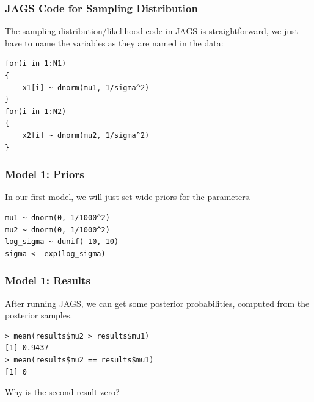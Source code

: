 \documentclass{beamer}
\begin{document}
\begin{frame}[fragile]
\frametitle{JAGS Code for Sampling Distribution}
The sampling distribution/likelihood code in JAGS is straightforward,
we just have to name the variables as they are named in the data:
\begin{verbatim}
for(i in 1:N1)
{
    x1[i] ~ dnorm(mu1, 1/sigma^2)
}
for(i in 1:N2)
{
    x2[i] ~ dnorm(mu2, 1/sigma^2)
}
\end{verbatim}

\end{frame}


\begin{frame}[fragile]
\frametitle{Model 1: Priors}
In our first model, we will just set wide priors for the parameters.

\begin{verbatim}
mu1 ~ dnorm(0, 1/1000^2)
mu2 ~ dnorm(0, 1/1000^2)
log_sigma ~ dunif(-10, 10)
sigma <- exp(log_sigma)
\end{verbatim}

\end{frame}


\begin{frame}[fragile]
\frametitle{Model 1: Results}
After running JAGS, we can get some posterior probabilities,
computed from the posterior samples.

\begin{verbatim}
> mean(results$mu2 > results$mu1)
[1] 0.9437
> mean(results$mu2 == results$mu1)
[1] 0
\end{verbatim}
\pause

Why is the second result zero?



\end{frame}
\end{document}
